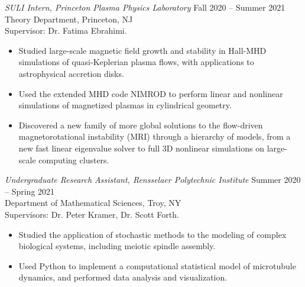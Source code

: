 \documentclass{rpires}
\begin{document}
\begin{resume}
\textit{SULI Intern, Princeton Plasma Physics Laboratory} \hfill Fall 2020 -- Summer 2021 \\
Theory Department, Princeton, NJ \\
Supervisor: Dr. Fatima Ebrahimi.
\begin{itemize}
  \item {Studied large-scale magnetic field growth and stability in Hall-MHD simulations of quasi-Keplerian plasma flows, with applications to astrophysical accretion disks.}
  \item {Used the extended MHD code NIMROD to perform linear and nonlinear simulations of magnetized plasmas in cylindrical geometry.}
  \item {Discovered a new family of more global solutions to the flow-driven magnetorotational instability (MRI) through a hierarchy of models, from a new fast linear eigenvalue solver to full 3D nonlinear simulations on large-scale computing clusters.}
\end{itemize}

\textit{Undergraduate Research Assistant, Rensselaer Polytechnic Institute} \hfill Summer 2020 -- Spring 2021 \\
Department of Mathematical Sciences, Troy, NY \\
Supervisors: Dr. Peter Kramer, Dr. Scott Forth.
\begin{itemize}
  \item {Studied the application of stochastic methods to the modeling of complex biological systems, including meiotic spindle assembly.}
  \item {Used Python to implement a computational statistical model of microtubule dynamics, and performed data analysis and visualization.}
\end{itemize}


\end{resume}
\end{document}
